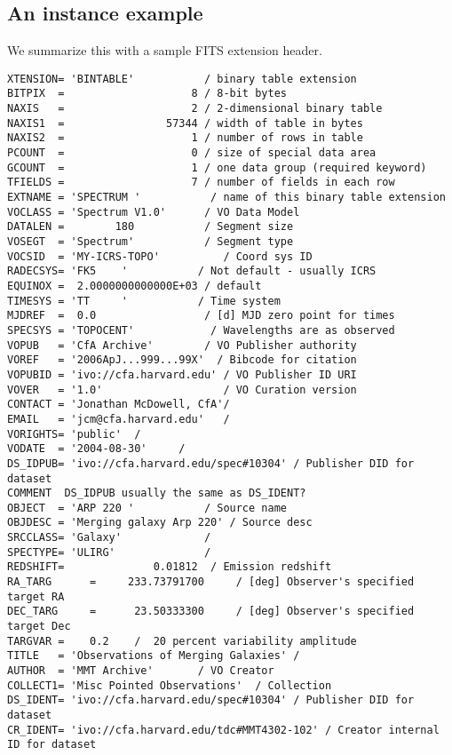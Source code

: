 \clearpage

\subsection{An instance example}


We summarize this with a sample FITS extension header.

{  \footnotesize
\begin{verbatim}
XTENSION= 'BINTABLE'           / binary table extension
BITPIX  =                    8 / 8-bit bytes
NAXIS   =                    2 / 2-dimensional binary table
NAXIS1  =                57344 / width of table in bytes
NAXIS2  =                    1 / number of rows in table
PCOUNT  =                    0 / size of special data area
GCOUNT  =                    1 / one data group (required keyword)
TFIELDS =                    7 / number of fields in each row
EXTNAME = 'SPECTRUM '           / name of this binary table extension
VOCLASS = 'Spectrum V1.0'      / VO Data Model
DATALEN =        180           / Segment size
VOSEGT  = 'Spectrum'           / Segment type
VOCSID  = 'MY-ICRS-TOPO'          / Coord sys ID
RADECSYS= 'FK5    '           / Not default - usually ICRS
EQUINOX =  2.0000000000000E+03 / default
TIMESYS = 'TT     '           / Time system
MJDREF  =  0.0                 / [d] MJD zero point for times
SPECSYS = 'TOPOCENT'            / Wavelengths are as observed
VOPUB   = 'CfA Archive'        / VO Publisher authority
VOREF   = '2006ApJ...999...99X'  / Bibcode for citation
VOPUBID = 'ivo://cfa.harvard.edu' / VO Publisher ID URI
VOVER   = '1.0'                   / VO Curation version
CONTACT = 'Jonathan McDowell, CfA'/
EMAIL   = 'jcm@cfa.harvard.edu'   /
VORIGHTS= 'public'  /
VODATE  = '2004-08-30'     /
DS_IDPUB= 'ivo://cfa.harvard.edu/spec#10304' / Publisher DID for dataset
COMMENT  DS_IDPUB usually the same as DS_IDENT?
OBJECT  = 'ARP 220 '           / Source name
OBJDESC = 'Merging galaxy Arp 220' / Source desc
SRCCLASS= 'Galaxy'             /
SPECTYPE= 'ULIRG'              /
REDSHIFT=              0.01812  / Emission redshift
RA_TARG      =     233.73791700     / [deg] Observer's specified target RA
DEC_TARG     =      23.50333300     / [deg] Observer's specified target Dec
TARGVAR =    0.2    /  20 percent variability amplitude
TITLE   = 'Observations of Merging Galaxies' /
AUTHOR  = 'MMT Archive'       / VO Creator
COLLECT1= 'Misc Pointed Observations'  / Collection
DS_IDENT= 'ivo://cfa.harvard.edu/spec#10304' / Publisher DID for dataset
CR_IDENT= 'ivo://cfa.harvard.edu/tdc#MMT4302-102' / Creator internal ID for dataset

\end{verbatim}}
